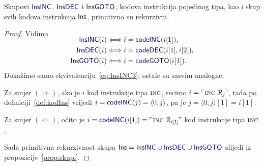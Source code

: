 \begin{lema}[{name=[primitivna rekurzivnost slike kodiranja RAM-instrukcija]}]\label{lm:InsTYPEprn}
    Skupovi $\f{InsINC}$, $\f{InsDEC}$ i $\f{InsGOTO}$, kodova instrukcija pojedinog tipa, kao i skup svih kodova instrukcija $\f{Ins}$, primitivno su rekurzivni.
\end{lema}
\begin{proof}
Vidimo
\begin{align}
\SwapAboveDisplaySkip
    \label{eq:InsINC3}\f{InsINC}(i)&\Longleftrightarrow i\eq\f{codeINC}(i[1])\text,\\
    \label{eq:InsDEC3}\f{InsDEC}(i)&\Longleftrightarrow i\eq\f{codeDEC}(i[1],i[2])\text,\\
    \label{eq:InsGOTO3}\f{InsGOTO}(i)&\Longleftrightarrow i\eq\f{codeGOTO}(i[1])\text.
\end{align}
    Dokažimo samo ekvivalenciju~\eqref{eq:InsINC3}, ostale su sasvim analogne.

	Za smjer $(\Rightarrow)$, ako je $i$ kod instrukcije tipa $\textsc{inc}$, recimo $i=\ulcorner\textsc{inc}\;\mathcal R_{j}\!\urcorner$, tada po definiciji~\ref{def:kodIns} vrijedi $i=\f{codeINC}(j)=\langle0,j\rangle$, pa je $j=\langle0,j\rangle[1]=i[1]$.%

    Za smjer $(\Leftarrow)$, očito je $i=\f{codeINC}(i[1])=\kins{\incr{i[1]}\!}$ kod instrukcije tipa $\textsc{inc}$.

    Sada primitivna rekurzivnost skupa $\f{Ins}=\f{InsINC}\cup\f{InsDEC}\cup\f{InsGOTO}$ slijedi iz propozicije~\ref{prop:skupl}.
\end{proof}


